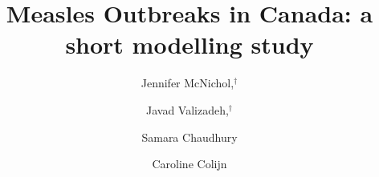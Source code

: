 \documentclass[12pt,a4paper]{article}
\begin{document}
\title{Measles Outbreaks in Canada: a short modelling study
}


\author[1]{Jennifer McNichol,$^\dag$}
\author[1]{Javad Valizadeh,$^\dag$}
\author[1]{Samara Chaudhury}
\author[1,*]{Caroline Colijn} 


\maketitle
\end{document}

